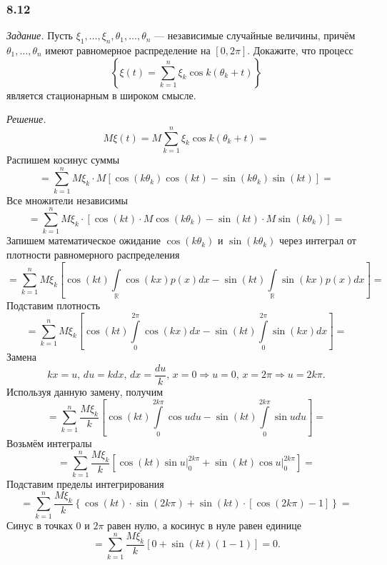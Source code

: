\subsubsection*{8.12}

\textit{Задание.}
Пусть $ \xi_1, \dotsc, \xi_n, \theta_1, \dotsc, \theta_n$ --- независимые случайные величины,
причём $ \theta_1, \dotsc, \theta_n$ имеют равномерное распределение на $ \left[ 0, 2 \pi \right] $.
Докажите, что процесс
$$ \left\{
    \xi \left( t \right) = \sum \limits_{k = 1}^n \xi_k \cos k \left( \theta_k + t \right)
  \right\} $$
является стационарным в широком смысле.

\textit{Решение.}
$$M \xi \left( t \right) =
  M \sum \limits_{k = 1}^n \xi_k \cos k \left( \theta_k + t \right) =$$
Распишем косинус суммы
$$= \sum \limits_{k = 1}^n
    M \xi_k \cdot
    M \left[
      \cos \left( k \theta_k \right) \cos \left( kt \right) -
      \sin \left( k \theta_k \right) \sin \left( kt \right) \right] =$$
Все множители независимы
$$= \sum \limits_{k = 1}^n
  M \xi_k \cdot
  \left[
    \cos \left( kt \right) \cdot M \cos \left( k \theta_k \right) -
    \sin \left( kt \right) \cdot M \sin \left( k \theta_k \right) \right] =$$
Запишем математическое ожидание $ \cos \left( k \theta_k \right) $ и
$ \sin \left( k \theta_k \right) $ через интеграл от плотности равномерного распределения
$$= \sum \limits_{k = 1}^n
  M \xi_k \left[
    \cos \left( kt \right) \int \limits_{ \mathbb{R}} \cos \left( kx \right) p \left( x \right) dx -
    \sin \left( kt \right) \int \limits_{ \mathbb{R}} \sin \left( kx \right) p \left( x \right) dx
  \right] =$$
Подставим плотность
$$= \sum \limits_{k = 1}^n
  M \xi_k \left[
    \cos \left( kt \right) \int \limits_0^{2 \pi } \cos \left( kx \right) dx -
    \sin \left( kt \right) \int \limits_0^{2 \pi } \sin \left( kx \right) dx \right] =$$
Замена
$$kx = u, \,
  du = kdx, \,
  dx = \frac{du}{k}, \,
  x = 0 \Rightarrow u = 0, \,
  x = 2 \pi \Rightarrow u = 2k \pi.$$
Используя данную замену, получим
$$= \sum \limits_{k = 1}^n
    \frac{M \xi_k}{k} \left[
      \cos \left( kt \right) \int \limits_0^{2k \pi } \cos udu -
      \sin \left( kt \right) \int \limits_0^{2k \pi } \sin udu \right] =$$
Возьмём интегралы
$$= \sum \limits_{k = 1}^n
    \frac{M \xi_k}{k} \left[
      \cos \left( kt \right) \left. \sin u \right|_0^{2k \pi } +
      \sin \left( kt \right) \left. \cos u \right|_0^{2k \pi } \right] =$$
Подставим пределы интегрирования
$$= \sum \limits_{k = 1}^n
    \frac{M \xi_k}{k}
    \left\{
      \cos \left( kt \right) \cdot \sin \left( 2k \pi \right) +
      \sin \left( kt \right) \cdot \left[ \cos \left( 2k \pi \right) - 1 \right] \right\} =$$
Синус в точках 0 и $2 \pi $ равен нулю, а косинус в нуле равен единице
$$= \sum \limits_{k = 1}^n
    \frac{M \xi_k}{k} \left[ 0 + \sin \left( kt \right) \left( 1 - 1 \right) \right] =
  0.$$

